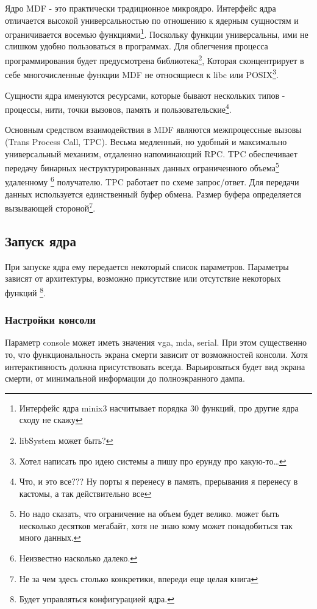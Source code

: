 Ядро MDF - это практически традиционное микроядро. Интерфейс ядра отличается
высокой универсальностью по отношению к ядерным сущностям и ограничивается
восемью функциями\footnote{Интерфейс ядра minix3 насчитывает порядка 30 функций,
про другие ядра сходу не скажу}. Поскольку функции универсальны, ими не слишком
удобно пользоваться в программах. Для облегчения процесса программирования будет
предусмотрена библиотека\footnote{libSystem может быть?}, Которая сконцентрирует
в себе многочисленные функции MDF не относящиеся к libc или POSIX\footnote{Хотел
написать про идею системы а пишу про ерунду про какую-то\ldots}.

Сущности ядра именуются ресурсами, которые бывают нескольких типов - процессы,
нити, точки вызовов, память и пользовательские\footnote{Что, и это все??? Ну
порты я перенесу в память, прерывания я перенесу в кастомы, а так действительно
все}.

Основным средством взаимодействия в MDF являются межпроцессные вызовы (Trans
Process Call, TPC). Весьма медленный, но удобный и максимально универсальный
механизм, отдаленно напоминающий RPC. TPC обеспечивает передачу бинарных
неструктурированных данных ограниченного объема\footnote{Но надо сказать, что
ограничение на объем будет велико. может быть несколько десятков мегабайт, хотя
не знаю кому может понадобиться так много данных.} удаленному
\footnote{Неизвестно насколько далеко.} получателю. TPC работает по схеме
запрос/ответ. Для передачи данных используется единственный буфер обмена. Размер
буфера определяется вызывающей стороной\footnote{Не за чем здесь столько
конкретики, впереди еще целая книга}.

\subsection{Запуск ядра}

При запуске ядра ему передается некоторый список параметров. Параметры зависят
от архитектуры, возможно присутствие или отсутствие некоторых функций
\footnote{Будет управляться конфигурацией ядра.}.

\subsubsection{Настройки консоли}

Параметр console может иметь значения vga, mda, serial. При этом существенно то,
что функциональность экрана смерти зависит от возможностей консоли. Хотя
интерактивность должна присутствовать всегда. Варьироваться будет вид экрана
смерти, от минимальной информации до полноэкранного дампа.

